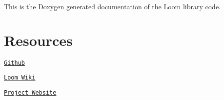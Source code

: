 This is the Doxygen generated documentation of the Loom library code.\hypertarget{index_resources}{}\section{Resources}\label{index_resources}

\begin{DoxyItemize}
\item \href{https://github.com/OPEnSLab-OSU/Loom}{\tt Github}
\item \href{https://github.com/OPEnSLab-OSU/Loom/wiki}{\tt Loom Wiki}
\item \href{http://www.open-sensing.org/project-loom}{\tt Project Website} 
\end{DoxyItemize}